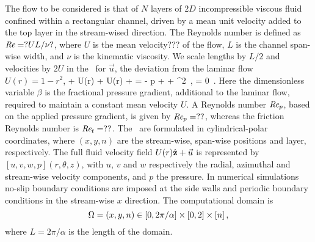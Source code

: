 
The flow to be considered is that of $N$ layers of $2D$
incompressible viscous fluid
confined within a rectangular channel, driven by a mean
unit velocity added to the top layer
in the stream-wised direction.  The Reynolds number is defined as
$\textit{Re} = ?U L / \nu?$, where $U$ is the mean velocity??? of the flow,
$L$ is the channel span-wise width, and $\nu$ is the kinematic viscosity. We
scale lengths by $L/2$ and velocities by $2U$ in the \NSe\ for
$\vec{u}$, the deviation from the laminar flow
\eqv\ $U(r)=1-r^2$,
\beq
{} + U(r)\cdot\bnabla{} +
\cdot\bnabla U(r) + \cdot\bnabla{} = - {\bnabla} p
+ \frac{4\beta}{\Reynolds} +
^2 \,, \quad \nabla \cdot {} =
0 \,.
Here the dimensionless variable $\beta$ is the fractional pressure
gradient, additional to the laminar flow, required to maintain a
constant mean velocity $U$. A Reynolds number $\Reynolds_p$, based on
the applied pressure gradient, is given by $\Reynolds_p = ??$,
whereas the friction Reynolds number is
$\Reynolds_{\zeit}=??$. The \NSe\ are formulated in
cylindrical-\-polar coordinates, where $(x, y, n)$ are the
stream-wise, span-wise positions and layer,
respectively. The full fluid velocity field $U(r)\hat{{\bf z}} +
\vec{u}$ is represented by $[u,v,w,p](r,\theta,z)$, with $u$, $v$ and
$w$ respectively the radial, azimuthal and stream-wise velocity
components, and $p$ the pressure. In numerical simulations no-slip
boundary conditions are imposed at the side walls and
periodic boundary conditions in the stream-wise $x$
direction. The computational domain is
\[
\bCell={(x,y,n) \in
  [0,2\pi/\alpha]\times[0,2]\times[n]}
\,,
\] where
$L=2\pi/\alpha$ is the length of the domain.

